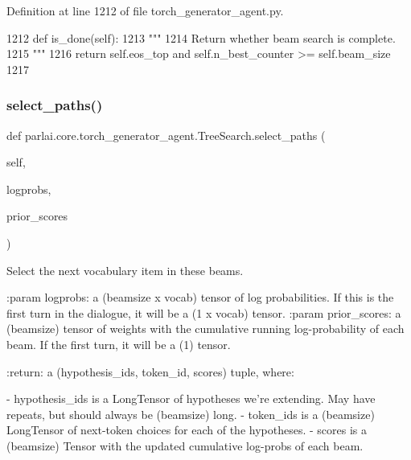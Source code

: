 Definition at line 1212 of file torch\+\_\+generator\+\_\+agent.\+py.


\begin{DoxyCode}
1212     \textcolor{keyword}{def }is\_done(self):
1213         \textcolor{stringliteral}{"""}
1214 \textcolor{stringliteral}{        Return whether beam search is complete.}
1215 \textcolor{stringliteral}{        """}
1216         \textcolor{keywordflow}{return} self.eos\_top \textcolor{keywordflow}{and} self.n\_best\_counter >= self.beam\_size
1217 
\end{DoxyCode}
\mbox{\label{classparlai_1_1core_1_1torch__generator__agent_1_1TreeSearch_a004609539d0428a9351a991168eb370b}} 
\subsubsection{\texorpdfstring{select\+\_\+paths()}{select\_paths()}}
{\footnotesize\ttfamily def parlai.\+core.\+torch\+\_\+generator\+\_\+agent.\+Tree\+Search.\+select\+\_\+paths (\begin{DoxyParamCaption}\item[{}]{self,  }\item[{}]{logprobs,  }\item[{}]{prior\+\_\+scores }\end{DoxyParamCaption})}

\begin{DoxyVerb}Select the next vocabulary item in these beams.

:param logprobs:
    a (beamsize x vocab) tensor of log probabilities. If this is the first
    turn in the dialogue, it will be a (1 x vocab) tensor.
:param prior_scores:
    a (beamsize) tensor of weights with the cumulative running
    log-probability of each beam. If the first turn, it will be a (1) tensor.

:return:
    a (hypothesis_ids, token_id, scores) tuple, where:

    - hypothesis_ids is a LongTensor of hypotheses we're extending. May have
      repeats, but should always be (beamsize) long.
    - token_ids is a (beamsize) LongTensor of next-token choices for
      each of the hypotheses.
    - scores is a (beamsize) Tensor with the updated cumulative log-probs
      of each beam.
\end{DoxyVerb}
 

